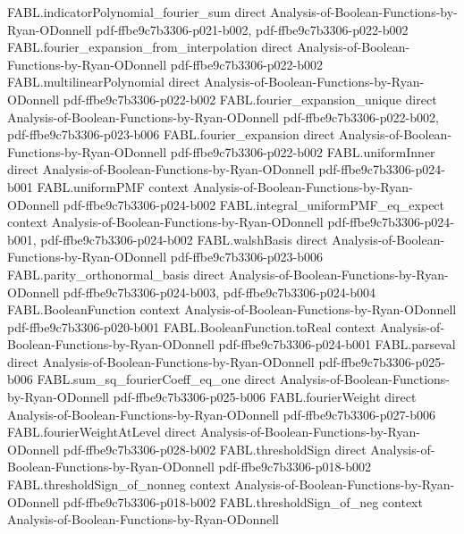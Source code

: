 \begin{theorem}
\proofstep
  {FABL.indicatorPolynomial_fourier_sum}
  {direct}
  {Analysis-of-Boolean-Functions-by-Ryan-ODonnell}
  {pdf-ffbe9c7b3306-p021-b002,
    pdf-ffbe9c7b3306-p022-b002}
\proofstep
  {FABL.fourier_expansion_from_interpolation}
  {direct}
  {Analysis-of-Boolean-Functions-by-Ryan-ODonnell}
  {pdf-ffbe9c7b3306-p022-b002}
\proofstep
  {FABL.multilinearPolynomial}
  {direct}
  {Analysis-of-Boolean-Functions-by-Ryan-ODonnell}
  {pdf-ffbe9c7b3306-p022-b002}
\proofstep
  {FABL.fourier_expansion_unique}
  {direct}
  {Analysis-of-Boolean-Functions-by-Ryan-ODonnell}
  {pdf-ffbe9c7b3306-p022-b002,
    pdf-ffbe9c7b3306-p023-b006}
\proofstep
  {FABL.fourier_expansion}
  {direct}
  {Analysis-of-Boolean-Functions-by-Ryan-ODonnell}
  {pdf-ffbe9c7b3306-p022-b002}
\proofstep
  {FABL.uniformInner}
  {direct}
  {Analysis-of-Boolean-Functions-by-Ryan-ODonnell}
  {pdf-ffbe9c7b3306-p024-b001}
\proofstep
  {FABL.uniformPMF}
  {context}
  {Analysis-of-Boolean-Functions-by-Ryan-ODonnell}
  {pdf-ffbe9c7b3306-p024-b002}
\proofstep
  {FABL.integral_uniformPMF_eq_expect}
  {context}
  {Analysis-of-Boolean-Functions-by-Ryan-ODonnell}
  {pdf-ffbe9c7b3306-p024-b001,
    pdf-ffbe9c7b3306-p024-b002}
\proofstep
  {FABL.walshBasis}
  {direct}
  {Analysis-of-Boolean-Functions-by-Ryan-ODonnell}
  {pdf-ffbe9c7b3306-p023-b006}
\proofstep
  {FABL.parity_orthonormal_basis}
  {direct}
  {Analysis-of-Boolean-Functions-by-Ryan-ODonnell}
  {pdf-ffbe9c7b3306-p024-b003,
    pdf-ffbe9c7b3306-p024-b004}
\proofstep
  {FABL.BooleanFunction}
  {context}
  {Analysis-of-Boolean-Functions-by-Ryan-ODonnell}
  {pdf-ffbe9c7b3306-p020-b001}
\proofstep
  {FABL.BooleanFunction.toReal}
  {context}
  {Analysis-of-Boolean-Functions-by-Ryan-ODonnell}
  {pdf-ffbe9c7b3306-p024-b001}
\proofstep
  {FABL.parseval}
  {direct}
  {Analysis-of-Boolean-Functions-by-Ryan-ODonnell}
  {pdf-ffbe9c7b3306-p025-b006}
\proofstep
  {FABL.sum_sq_fourierCoeff_eq_one}
  {direct}
  {Analysis-of-Boolean-Functions-by-Ryan-ODonnell}
  {pdf-ffbe9c7b3306-p025-b006}
\proofstep
  {FABL.fourierWeight}
  {direct}
  {Analysis-of-Boolean-Functions-by-Ryan-ODonnell}
  {pdf-ffbe9c7b3306-p027-b006}
\proofstep
  {FABL.fourierWeightAtLevel}
  {direct}
  {Analysis-of-Boolean-Functions-by-Ryan-ODonnell}
  {pdf-ffbe9c7b3306-p028-b002}
\proofstep
  {FABL.thresholdSign}
  {direct}
  {Analysis-of-Boolean-Functions-by-Ryan-ODonnell}
  {pdf-ffbe9c7b3306-p018-b002}
\proofstep
  {FABL.thresholdSign_of_nonneg}
  {context}
  {Analysis-of-Boolean-Functions-by-Ryan-ODonnell}
  {pdf-ffbe9c7b3306-p018-b002}
\proofstep
  {FABL.thresholdSign_of_neg}
  {context}
  {Analysis-of-Boolean-Functions-by-Ryan-ODonnell}

\end{theorem}
